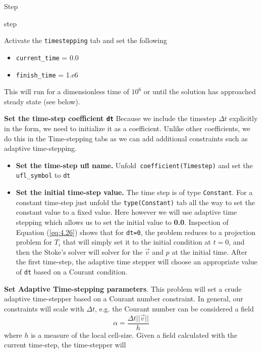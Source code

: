 \begin{steps}{Step}
\begin{steps}{step}
    \item Activate the \texttt{timestepping} tab and set the following
    \begin{itemize}
    \item \texttt{current\_time} = 0.0
    \item \texttt{finish\_time} = 1.e6
    \end{itemize}
    This will run for a dimensionless time of $10^{6}$ or until the
    solution has approached steady state (see below).
  \item \textbf{Set the time-step coefficient \texttt{dt}} Because we
    include the timestep $\Delta t$ explicitly in the form, we need to
    initialize it as a coefficient.  Unlike other coefficients, we do
    this in the Time-stepping tabs as we can add additional
    constraints such as adaptive time-stepping.
    \begin{itemize}
    \item\textbf{ Set the time-step ufl name.} Unfold\texttt{ coefficient(Timestep)} and set the
      \texttt{ufl\_symbol} to \texttt{dt}
    \item \textbf{Set the initial time-step value.}  The time step is
      of type \texttt{Constant}.  For a constant time-step just unfold the \texttt{type(Constant)} tab all the way to set
      the constant value to a fixed value.  Here however we will use
      adaptive time stepping which allows us to set the initial value
      to \textbf{0.0}. Inspection of Equation (\ref{eq:4.26}) shows that
      for \texttt{dt=0}, the problem reduces to a projection problem
      for $T_{i}$ that will simply set it to the initial condition at
      $t=0$, and then the Stoke's solver will solver for the $\vec{v}$
      and $p$ at the initial time.  After the first time-step, the
      adaptive time stepper will choose an appropriate value of
      \texttt{dt} based on a Courant condition.
    \end{itemize}
  \item \textbf{Set Adaptive Time-stepping parameters}. This problem
    will set a crude adaptive time-stepper based on a Courant number
    constraint.  In general, our constraints will
    scale with $\Delta t$, e.g. the Courant number can be considered a
    field
    \begin{displaymath}
      \alpha = \frac{\Delta t ||\vec{v}||}{h}
    \end{displaymath}
    where $h$ is a measure of the local cell-size.  Given a field
    calculated with the current time-step,  the time-stepper will

\end{steps}
\end{steps}
